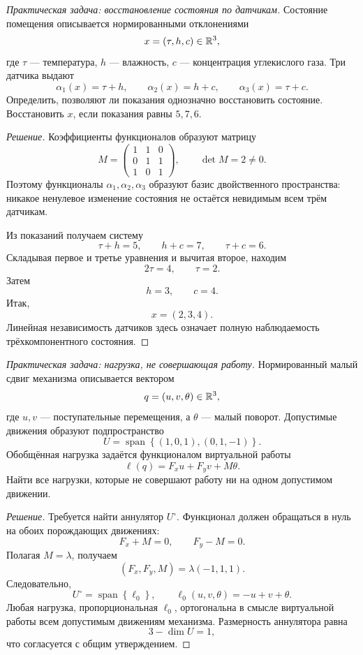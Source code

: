\begin{problem}
\textit{Практическая задача: восстановление состояния по датчикам.}
Состояние помещения описывается нормированными отклонениями
\[
x=(\tau,h,c)\in\mathbb{R}^3,
\]
где \(\tau\) --- температура, \(h\) --- влажность, \(c\) --- концентрация углекислого газа. Три датчика выдают
\[
\alpha_1(x)=\tau+h,
\qquad
\alpha_2(x)=h+c,
\qquad
\alpha_3(x)=\tau+c.
\]
Определить, позволяют ли показания однозначно восстановить состояние. Восстановить \(x\), если показания равны \(5,7,6\).
\end{problem}

\begin{proof}[Решение]
Коэффициенты функционалов образуют матрицу
\[
M=
\begin{pmatrix}
1&1&0\\
0&1&1\\
1&0&1
\end{pmatrix},
\qquad
\det M=2\neq0.
\]
Поэтому функционалы \(\alpha_1,\alpha_2,\alpha_3\) образуют базис двойственного пространства: никакое ненулевое изменение состояния не остаётся невидимым всем трём датчикам.

Из показаний получаем систему
\[
\tau+h=5,
\qquad
h+c=7,
\qquad
\tau+c=6.
\]
Складывая первое и третье уравнения и вычитая второе, находим
\[
2\tau=4,
\qquad
\tau=2.
\]
Затем
\[
h=3,
\qquad
c=4.
\]
Итак,
\[
x=(2,3,4).
\]
Линейная независимость датчиков здесь означает полную наблюдаемость трёхкомпонентного состояния.
\end{proof}

\begin{problem}
\textit{Практическая задача: нагрузка, не совершающая работу.}
Нормированный малый сдвиг механизма описывается вектором
\[
q=(u,v,\theta)\in\mathbb{R}^3,
\]
где \(u,v\) --- поступательные перемещения, а \(\theta\) --- малый поворот. Допустимые движения образуют подпространство
\[
U=\operatorname{span}
\left\{
(1,0,1),
(0,1,-1)
\right\}.
\]
Обобщённая нагрузка задаётся функционалом виртуальной работы
\[
\ell(q)=F_xu+F_yv+M\theta.
\]
Найти все нагрузки, которые не совершают работу ни на одном допустимом движении.
\end{problem}

\begin{proof}[Решение]
Требуется найти аннулятор \(U^\circ\). Функционал должен обращаться в нуль на обоих порождающих движениях:
\[
F_x+M=0,
\qquad
F_y-M=0.
\]
Полагая \(M=\lambda\), получаем
\[
(F_x,F_y,M)=\lambda(-1,1,1).
\]
Следовательно,
\[
U^\circ
=
\operatorname{span}
\left\{\ell_0\right\},
\qquad
\ell_0(u,v,\theta)=-u+v+\theta.
\]
Любая нагрузка, пропорциональная \(\ell_0\), ортогональна в смысле виртуальной работы всем допустимым движениям механизма. Размерность аннулятора равна
\[
3-\dim U=1,
\]
что согласуется с общим утверждением.
\end{proof}

